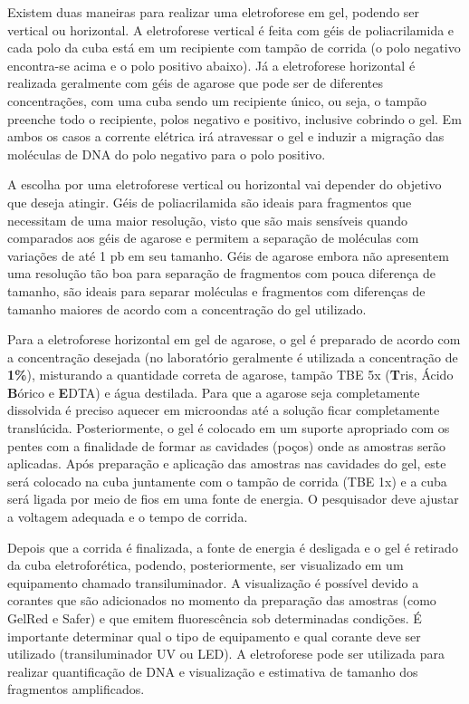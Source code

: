 \documentclass[
  letterpaper,
  DIV=11,
  numbers=noendperiod]{scrreprt}
\begin{document}
Existem duas maneiras para realizar uma eletroforese em gel, podendo ser
vertical ou horizontal. A eletroforese vertical é feita com géis de
poliacrilamida e cada polo da cuba está em um recipiente com tampão de
corrida (o polo negativo encontra-se acima e o polo positivo abaixo). Já
a eletroforese horizontal é realizada geralmente com géis de agarose que
pode ser de diferentes concentrações, com uma cuba sendo um recipiente
único, ou seja, o tampão preenche todo o recipiente, polos negativo e
positivo, inclusive cobrindo o gel. Em ambos os casos a corrente
elétrica irá atravessar o gel e induzir a migração das moléculas de DNA
do polo negativo para o polo positivo.

A escolha por uma eletroforese vertical ou horizontal vai depender do
objetivo que deseja atingir. Géis de poliacrilamida são ideais para
fragmentos que necessitam de uma maior resolução, visto que são mais
sensíveis quando comparados aos géis de agarose e permitem a separação
de moléculas com variações de até 1 pb em seu tamanho. Géis de agarose
embora não apresentem uma resolução tão boa para separação de fragmentos
com pouca diferença de tamanho, são ideais para separar moléculas e
fragmentos com diferenças de tamanho maiores de acordo com a
concentração do gel utilizado.

Para a eletroforese horizontal em gel de agarose, o gel é preparado de
acordo com a concentração desejada (no laboratório geralmente é
utilizada a concentração de \textbf{1\%}), misturando a quantidade
correta de agarose, tampão TBE 5x (\textbf{T}ris, Ácido \textbf{B}órico
e \textbf{E}DTA) e água destilada. Para que a agarose seja completamente
dissolvida é preciso aquecer em microondas até a solução ficar
completamente translúcida. Posteriormente, o gel é colocado em um
suporte apropriado com os pentes com a finalidade de formar as cavidades
(poços) onde as amostras serão aplicadas. Após preparação e aplicação
das amostras nas cavidades do gel, este será colocado na cuba juntamente
com o tampão de corrida (TBE 1x) e a cuba será ligada por meio de fios
em uma fonte de energia. O pesquisador deve ajustar a voltagem adequada
e o tempo de corrida.

Depois que a corrida é finalizada, a fonte de energia é desligada e o
gel é retirado da cuba eletroforética, podendo, posteriormente, ser
visualizado em um equipamento chamado transiluminador. A visualização é
possível devido a corantes que são adicionados no momento da preparação
das amostras (como GelRed e Safer) e que emitem fluorescência sob
determinadas condições. É importante determinar qual o tipo de
equipamento e qual corante deve ser utilizado (transiluminador UV ou
LED). A eletroforese pode ser utilizada para realizar quantificação de
DNA e visualização e estimativa de tamanho dos fragmentos amplificados.
\end{document}
